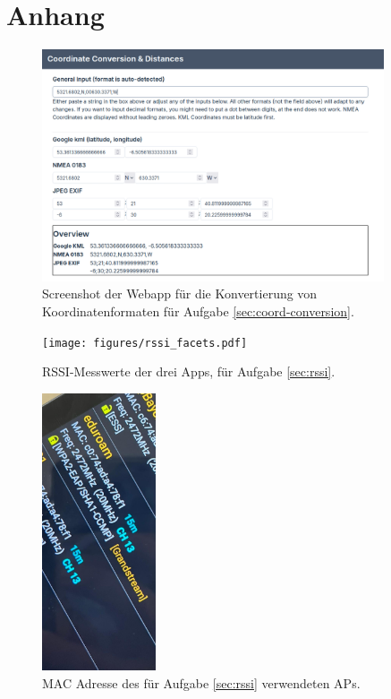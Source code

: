 \newpage
\section*{Anhang}

\begin{figure}[h]
    \centering
    \includegraphics[width=0.9\textwidth]{figures/koordinaten.png}
    \caption{Screenshot der Webapp für die Konvertierung von Koordinatenformaten für Aufgabe \ref{sec:coord-conversion}.}
    \label{webapp-coordinates}
\end{figure}

\begin{figure}[h]
    \centering
    \texttt{[image: figures/rssi\_facets.pdf]}
    \caption{RSSI-Messwerte der drei Apps, für Aufgabe \ref{sec:rssi}.}
    \label{rssi-facet}
\end{figure}

\begin{figure}[h]
    \centering
    \includegraphics[width=0.3\textwidth]{figures/rssi-ssid.jpg}
    \caption{MAC Adresse des für Aufgabe \ref{sec:rssi} verwendeten APs.}
    \label{rssi-mac}
\end{figure}


